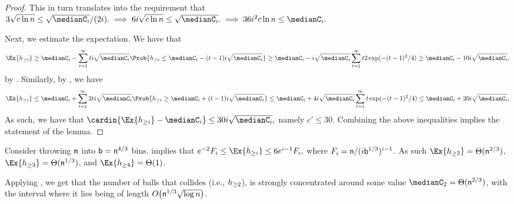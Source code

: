 \begin{proof}
    This in turn translates into the requirement that 
    \begin{math}
        3\sqrt{c \ln n} \leq \sqrt{ \medianC_i}/(2i).%
        \implies%
        6i\sqrt{c \ln n} \leq \sqrt{ \medianC_i}.%
        \implies%
        36i^2 c \ln n \leq \medianC_i.%
    \end{math}    

    Next, we estimate the expectation. We have that
    \begin{equation*}
        \Ex{ \NHX{i}} %
        \geq%
        \medianC_i  - \sum_{t=1}^\infty t i \sqrt{ \medianC_i}
        \Prob{ \NHX{i} \leq  \medianC_i - (t-1)i\sqrt{ \medianC_i}}%
        \geq%
        \medianC_i  - i \sqrt{ \medianC_i} \sum_{t=1}^\infty t 
        2\exp(-(t-1)^2/4)%
        \geq %
        \medianC_i  - 10 i \sqrt{ \medianC_i},
    \end{equation*}
    by . Similarly, by , we
    have
    \begin{equation*}
        \Ex{ \NHX{i}} %
        \leq%
        \medianC_i  + \sum_{t=1}^\infty 2ti \sqrt{ \medianC_i}
        \Prob{ \NHX{i} \geq  \medianC_i + (t-1)i\sqrt{ \medianC_i}}%
        \leq%
        \medianC_i  + 4 i \sqrt{ \medianC_i} \sum_{t=1}^\infty t 
        \exp(-(t-1)^2/4)%
        \leq %
        \medianC_i  + 20 i \sqrt{ \medianC_i},
    \end{equation*}
    As such, we have that
    \begin{math}
        \cardin{ \Ex{ \NHX{i}} - \medianC_i } \leq 30 i \sqrt{
           \medianC_i},
    \end{math}
    namely $c' \leq 30$. Combining the above inequalities implies the
    statement of the lemma.
\end{proof}

\begin{example}
    Consider throwing $\mathsf{n}$ into $\mathsf{b} = \mathsf{n}^{4/3}$ bins.
     implies that
    \begin{math}
        e^{-2} F_i \leq%
        \Ex{\NHX{i}} %
        \leq 6e^{i-1} F_i,
    \end{math}
    where
    \begin{math}
        F_i = \mathsf{n} / ( i \mathsf{b}^{1/3})^{i-1}.
    \end{math}
    As such $ \Ex{\NHX{2}} = \Theta( \nballs^{2/3})$,
    $ \Ex{\NHX{3}} = \Theta( \nballs^{1/3})$, and
    $ \Ex{\NHX{4}} = \Theta( 1 )$.

    Applying , we get that the number of
    balls that collides (i.e., $h_{\geq 2}$), is strongly concentrated
    around some value $\medianC_2 =\Theta( \nballs^{2/3})$, with the
    interval where it lies being of length
    $O\bigl( \mathsf{n}^{1/3} \sqrt{\log n}\bigr)$.
\end{example}



